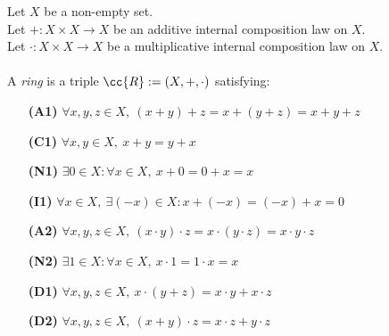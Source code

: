 \begin{definition-pre}[Ring]
    \label{def:ring}
    Let $X$ be a non-empty set. \\
    Let $+: X\times X \to X$ be an additive internal composition law on $X$. \\
    Let $\cdot: X\times X \to X$ be a multiplicative internal composition law on $X$. \\\\
    A \textit{ring} is a triple $\cc{R}:= (X, +, \cdot)$ satisfying:
    \begin{enumerate}
        \item [\textbf{(A1)}] $\forall x,y,z\in X,\ (x+y)+z= x+(y+z) = x+y+z$
        \item [\textbf{(C1)}] $\forall x,y\in X,\ x+y = y+x$
        \item [\textbf{(N1)}] $\exists 0 \in X : \forall x \in X,\ x+0 = 0+x = x$
        \item [\textbf{(I1)}] $\forall x \in X,\ \exists (-x)\in X: x+(-x) = (-x)+x = 0$
        \item [\textbf{(A2)}] $\forall x,y,z\in X,\ (x\cdot y)\cdot z= x\cdot(y\cdot z) = x\cdot y\cdot z$
        \item [\textbf{(N2)}] $\exists 1 \in X : \forall x \in X,\ x\cdot1 = 1\cdot x = x$
        \item [\textbf{(D1)}] $\forall x,y,z \in X,\ x\cdot(y+z)=x\cdot y+x\cdot z$
        \item [\textbf{(D2)}] $\forall x,y,z \in X,\ (x+y)\cdot z=x\cdot z+y\cdot z$
    \end{enumerate}
\end{definition-pre}

